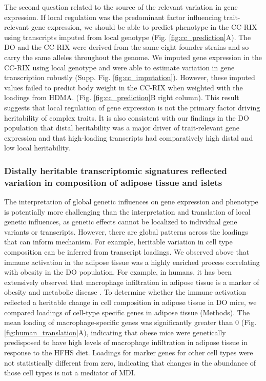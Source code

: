 \documentclass[
]{article}
\begin{document}
The second question related to the source of the relevant variation in
gene expression. If local regulation was the predominant factor
influencing trait-relevant gene expression, we should be able to predict
phenotype in the CC-RIX using transcripts imputed from local genotype
(Fig. \ref{fig:cc_prediction}A). The DO and the CC-RIX were derived from
the same eight founder strains and so carry the same alleles throughout
the genome. We imputed gene expression in the CC-RIX using local
genotype and were able to estimate variation in gene transcription
robustly (Supp. Fig. \ref{fig:cc_imputation}). However, these imputed
values failed to predict body weight in the CC-RIX when weighted with
the loadings from HDMA. (Fig. \ref{fig:cc_prediction}B right column).
This result suggests that local regulation of gene expression is not the
primary factor driving heritability of complex traits. It is also
consistent with our findings in the DO population that distal
heritability was a major driver of trait-relevant gene expression and
that high-loading transcripts had comparatively high distal and low
local heritability.

\subsubsection{Distally heritable transcriptomic signatures reflected
variation in composition of adipose tissue and
islets}\label{distally-heritable-transcriptomic-signatures-reflected-variation-in-composition-of-adipose-tissue-and-islets}

The interpretation of global genetic influences on gene expression and
phenotype is potentially more challenging than the interpretation and
translation of local genetic influences, as genetic effects cannot be
localized to individual gene variants or transcripts. However, there are
global patterns across the loadings that can inform mechanism. For
example, heritable variation in cell type composition can be inferred
from transcript loadings. We observed above that immune activation in
the adipose tissue was a highly enriched process correlating with
obesity in the DO population. For example, in humans, it has been
extensively observed that macrophage infiltration in adipose tissue is a
marker of obesity and metabolic disease \cite{pmid24781408}. To
determine whether the immune activation reflected a heritable change in
cell composition in adipose tissue in DO mice, we compared loadings of
cell-type specific genes in adipose tissue (Methods). The mean loading
of macrophage-specific genes was significantly greater than 0 (Fig.
\ref{fig:human_translation}A), indicating that obese mice were
genetically predisposed to have high levels of macrophage infiltration
in adipose tissue in response to the HFHS diet. Loadings for marker
genes for other cell types were not statistically different from zero,
indicating that changes in the abundance of those cell types is not a
mediator of MDI.
\end{document}
